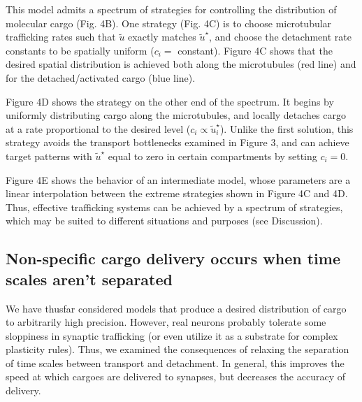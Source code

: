\documentclass[10pt]{wlpeerj}
\begin{document}
This model admits a spectrum of strategies for controlling the distribution of molecular cargo (Fig. 4B).
One strategy (Fig. 4C) is to choose microtubular trafficking rates such that $\tilde{u}$ exactly matches $\tilde{u}^\star$, and choose the detachment rate constants to be spatially uniform ($c_i =$ constant).
Figure 4C shows that the desired spatial distribution is achieved both along the microtubules (red line) and for the detached/activated cargo (blue line).

Figure 4D shows the strategy on the other end of the spectrum.
It begins by uniformly distributing cargo along the microtubules, and locally detaches cargo at a rate proportional to the desired level ($c_i \propto \tilde{u}^\star_i$).
Unlike the first solution, this strategy avoids the transport bottlenecks examined in Figure 3, and can achieve target patterns with  $\tilde{u}^\star$ equal to zero in certain compartments by setting $c_i = 0$. 

Figure 4E shows the behavior of an intermediate model, whose parameters are a linear interpolation between the extreme strategies shown in Figure 4C and 4D.
Thus, effective trafficking systems can be achieved by a spectrum of strategies, which may be suited to different situations and purposes (see Discussion). 

\subsection*{Non-specific cargo delivery occurs when time scales aren't separated}

We have thusfar considered models that produce a desired distribution of cargo to arbitrarily high precision.
However, real neurons probably tolerate some sloppiness in synaptic trafficking (or even utilize it as a substrate for complex plasticity rules).
Thus, we examined the consequences of relaxing the separation of time scales between transport and detachment.
In general, this improves the speed at which cargoes are delivered to synapses, but decreases the accuracy of delivery.
\end{document}
